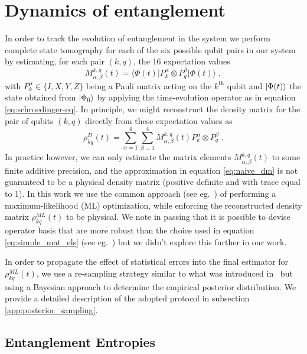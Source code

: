 \documentclass[Dual]{msu-thesis}
\begin{document}
\section{Dynamics of entanglement}

In order to track the evolution of entanglement in the system we perform complete state tomography for each of the six possible qubit pairs in our system by estimating, for each pair $(k,q)$, the 16 expectation values
\begin{equation}
\label{eq:simple_mat_els}
M^{k,q}_{\alpha,\beta}(t) = \langle \Phi(t)\lvert P_k^\alpha\otimes P_q^\beta \rvert \Phi(t)\rangle\;,
\end{equation}
with $P^{\alpha}_k\in\{I,X,Y,Z\}$ being a Pauli matrix acting on the $k^\text{th}$ qubit and $\ket{\Phi(t)}$ the state obtained from $\ket{\Phi_0}$ by applying the time-evolution operator as in equation \eqref{eq:schroedinger-eq}. In principle, we might reconstruct the density matrix for the pair of qubits $(k,q)$ directly from these expectation values as
\begin{equation}
\label{eq:naive_dm}
{\rho}^D_{kq}(t) = \sum_{\alpha=1}^4\sum_{\beta=1}^4M^{k,q}_{\alpha,\beta}(t)P_k^\alpha\otimes P_q^\beta\;.
\end{equation}
In practice however, we can only estimate the matrix elements $M^{k,q}_{\alpha,\beta}(t)$ to some finite additive precision, and the approximation in equation \eqref{eq:naive_dm} is not guaranteed to be a physical density matrix (positive definite and with trace equal to 1). In this work we use the common approach (see eg.~\cite{Banaszek1999}) of performing a maximum-likelihood (ML) optimization, while enforcing the reconstructed density matrix ${\rho}^{ML}_{kq}(t)$ to be physical. We note in passing that it is possible to devise operator basis that are more robust than the choice used in equation \eqref{eq:simple_mat_els} (see eg.~\cite{Czartowski2020}) but we didn't explore this further in our work.

In order to propagate the effect of statistical errors into the final estimator for ${\rho}^{ML}_{kq}(t)$, we use a re-sampling strategy similar to what was introduced in~\cite{Roggero_nptodg} but using a Bayesian approach to determine the empirical posterior distribution. We provide a detailed description of the adopted protocol in subsection \ref{app:posterior_sampling}.

\subsection{Entanglement Entropies}
\end{document}
